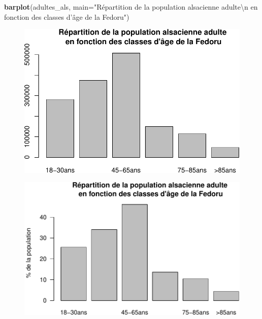 \documentclass[]{article}
\newenvironment{Shaded}{\begin{snugshade}}{\end{snugshade}}
\newcommand{\KeywordTok}[1]{\textcolor[rgb]{0.13,0.29,0.53}{\textbf{{#1}}}}
\newcommand{\DataTypeTok}[1]{\textcolor[rgb]{0.13,0.29,0.53}{{#1}}}
\newcommand{\DecValTok}[1]{\textcolor[rgb]{0.00,0.00,0.81}{{#1}}}
\newcommand{\CharTok}[1]{\textcolor[rgb]{0.31,0.60,0.02}{{#1}}}
\newcommand{\StringTok}[1]{\textcolor[rgb]{0.31,0.60,0.02}{{#1}}}
\newcommand{\CommentTok}[1]{\textcolor[rgb]{0.56,0.35,0.01}{\textit{{#1}}}}
\newcommand{\NormalTok}[1]{{#1}}
\begin{document}
\begin{Shaded}
\begin{Highlighting}[]
\KeywordTok{barplot}\NormalTok{(adultes_als, }\DataTypeTok{main=}\StringTok{"Répartition de la population alsacienne adulte}\CharTok{\textbackslash{}n}\StringTok{ en fonction des classes d'âge de la Fedoru"}\NormalTok{)}
\end{Highlighting}
\end{Shaded}

\begin{figure}[htbp]
\centering
\includegraphics{age_files/figure-latex/pop_als-4.pdf}
\end{figure}

\begin{Shaded}
\end{Shaded}

\begin{figure}[htbp]
\centering
\includegraphics{age_files/figure-latex/pop_als-5.pdf}
\end{figure}
\end{document}
